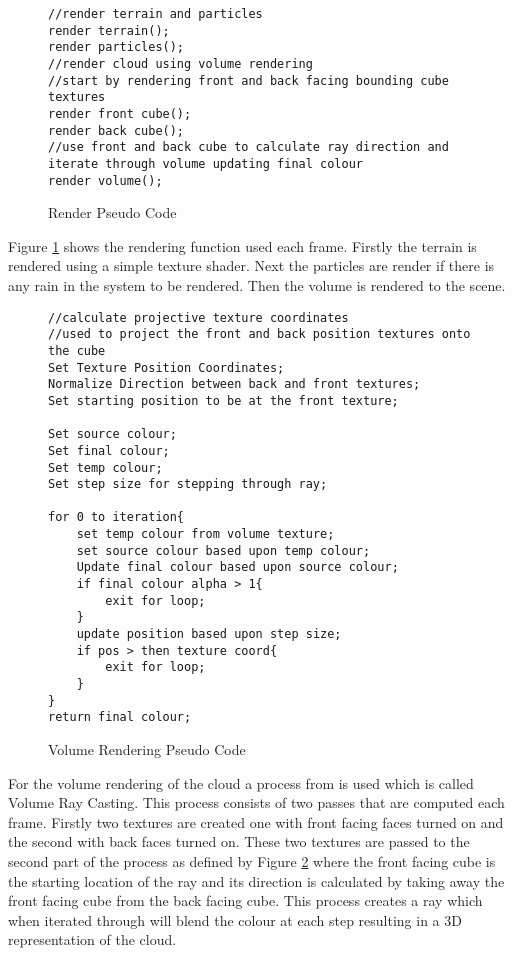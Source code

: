 \begin{figure}[h]
\centering
\begin{lstlisting}
//render terrain and particles
render terrain();
render particles();
//render cloud using volume rendering 
//start by rendering front and back facing bounding cube textures
render front cube();
render back cube(); 
//use front and back cube to calculate ray direction and iterate through volume updating final colour
render volume();
\end{lstlisting}
\caption{Render Pseudo Code}
\label{sc:RenderingPseudoCode}
\end{figure}

Figure \ref{sc:RenderingPseudoCode} shows the rendering function used each frame.
Firstly the terrain is rendered using a simple texture shader.
Next the particles are render if there is any rain in the system to be rendered.
Then the volume is rendered to the scene. 

\begin{figure}[h]
\centering
\begin{lstlisting}
//calculate projective texture coordinates
//used to project the front and back position textures onto the cube
Set Texture Position Coordinates;
Normalize Direction between back and front textures;
Set starting position to be at the front texture;

Set source colour;
Set final colour;
Set temp colour;
Set step size for stepping through ray;
	
for 0 to iteration{
	set temp colour from volume texture;
	set source colour based upon temp colour;
	Update final colour based upon source colour;
	if final colour alpha > 1{
		exit for loop;
	}
	update position based upon step size;
	if pos > then texture coord{
		exit for loop;
	}
}
return final colour;
\end{lstlisting}
\caption{Volume Rendering Pseudo Code}
\label{sc:Volume_rendering}
\end{figure}

For the volume rendering of the cloud a process from \citet{KHayward09} is used which is called Volume Ray Casting.
This process consists of two passes that are computed each frame.
Firstly two textures are created one with front facing faces turned on and the second with back faces turned on.
These two textures are passed to the second part of the process as defined by Figure \ref{sc:Volume_rendering} where the front facing cube is the starting location of the ray and its direction is calculated by taking away the front facing cube from the back facing cube.
This process creates a ray which when iterated through will blend the colour at each step resulting in a 3D representation of the cloud.

